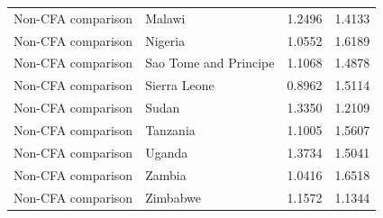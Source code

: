 \begin{table}
\begin{tabular}[t]{llrr}
Non-CFA comparison & Malawi & 1.2496 & 1.4133\\
Non-CFA comparison & Nigeria & 1.0552 & 1.6189\\
Non-CFA comparison & Sao Tome and Principe & 1.1068 & 1.4878\\
Non-CFA comparison & Sierra Leone & 0.8962 & 1.5114\\
\addlinespace
Non-CFA comparison & Sudan & 1.3350 & 1.2109\\
Non-CFA comparison & Tanzania & 1.1005 & 1.5607\\
Non-CFA comparison & Uganda & 1.3734 & 1.5041\\
Non-CFA comparison & Zambia & 1.0416 & 1.6518\\
Non-CFA comparison & Zimbabwe & 1.1572 & 1.1344\\
\bottomrule
\end{tabular}
\end{table}